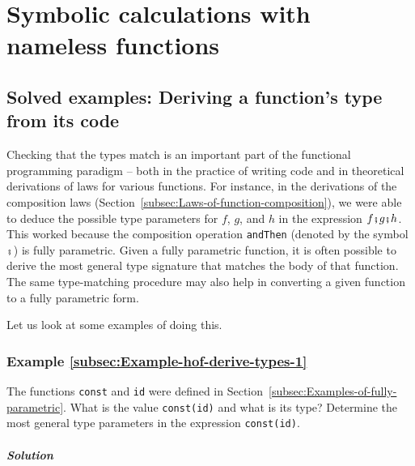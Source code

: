 \section{Symbolic calculations with nameless functions}

\subsection{Solved examples: Deriving a function's type from its code}

Checking that the types match is an important part of the functional
programming paradigm – both in the practice of writing code and in
theoretical derivations of laws for various functions. For instance,
in the derivations of the composition laws (Section~\ref{subsec:Laws-of-function-composition}),
we were able to deduce the possible type parameters for $f$, $g$,
and $h$ in the expression $f\bef g\bef h$. This worked because the
composition operation \lstinline!andThen!
(denoted by the symbol $\bef$) is fully parametric. Given a fully
parametric function, it is often possible to derive the most general
type signature that matches the body of that function. The same type-matching
procedure may also help in converting a given function to a fully
parametric form.

Let us look at some examples of doing this.

\subsubsection{Example \label{subsec:Example-hof-derive-types-1}\ref{subsec:Example-hof-derive-types-1}}

The functions \lstinline!const!
and \lstinline!id! were
defined in Section~\ref{subsec:Examples-of-fully-parametric}. What
is the value \lstinline!const(id)!
and what is its type? Determine the most general type parameters in
the expression \lstinline!const(id)!.

\subparagraph{Solution}

